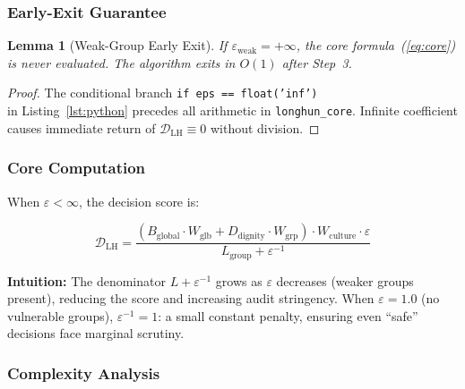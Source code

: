 \documentclass[conference]{IEEEtran}
\newtheorem{lemma}{Lemma}
\begin{document}
\subsubsection{Early-Exit Guarantee}

\begin{lemma}[Weak-Group Early Exit]
\label{lem:early-exit}
If $\varepsilon_{\text{weak}} = +\infty$,
the core formula~(\ref{eq:core}) is never evaluated.
The algorithm exits in $O(1)$ after Step~3.
\end{lemma}

\begin{proof}
The conditional branch \texttt{if eps == float('inf')}\\
in Listing~\ref{lst:python} precedes all arithmetic
in \texttt{longhun\_core}.
Infinite coefficient causes immediate return of
$\mathcal{D}_{\text{LH}} \equiv 0$ without division.
\end{proof}

\subsubsection{Core Computation}

When $\varepsilon < \infty$, the decision score is:

\begin{equation}
  \mathcal{D}_{\text{LH}}
  = \frac{
      (B_{\text{global}} \cdot W_{\text{glb}}
       + D_{\text{dignity}} \cdot W_{\text{grp}})
      \cdot W_{\text{culture}} \cdot \varepsilon
    }{
      L_{\text{group}}
      + \varepsilon^{-1}
    }
  \label{eq:core-expanded}
\end{equation}

\textbf{Intuition:}
The denominator $L + \varepsilon^{-1}$ grows as
$\varepsilon$ decreases (weaker groups present),
reducing the score and increasing audit stringency.
When $\varepsilon = 1.0$ (no vulnerable groups),
$\varepsilon^{-1} = 1$: a small constant penalty,
ensuring even ``safe'' decisions face marginal scrutiny.

\subsubsection{Complexity Analysis}
\end{document}
